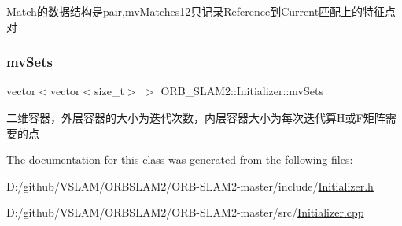 Match的数据结构是pair,mv\+Matches12只记录\+Reference到\+Current匹配上的特征点对 

\mbox{\label{class_o_r_b___s_l_a_m2_1_1_initializer_a572144f600b28828d4772b0470206afe}} 
\subsubsection{\texorpdfstring{mv\+Sets}{mvSets}}
{\footnotesize\ttfamily vector$<$vector$<$size\+\_\+t$>$ $>$ O\+R\+B\+\_\+\+S\+L\+A\+M2\+::\+Initializer\+::mv\+Sets\hspace{0.3cm}{\ttfamily [private]}}



二维容器，外层容器的大小为迭代次数，内层容器大小为每次迭代算\+H或\+F矩阵需要的点 



The documentation for this class was generated from the following files\+:\begin{DoxyCompactItemize}
\item 
D\+:/github/\+V\+S\+L\+A\+M/\+O\+R\+B\+S\+L\+A\+M2/\+O\+R\+B-\/\+S\+L\+A\+M2-\/master/include/\mbox{\hyperlink{_initializer_8h}{Initializer.\+h}}\item 
D\+:/github/\+V\+S\+L\+A\+M/\+O\+R\+B\+S\+L\+A\+M2/\+O\+R\+B-\/\+S\+L\+A\+M2-\/master/src/\mbox{\hyperlink{_initializer_8cpp}{Initializer.\+cpp}}\end{DoxyCompactItemize}
